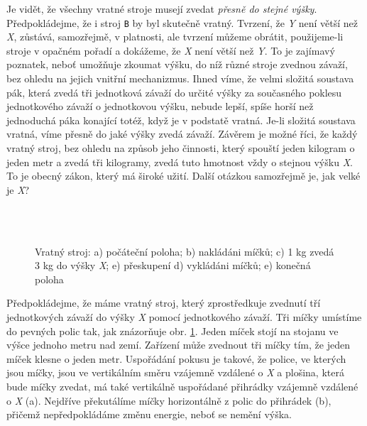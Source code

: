     Je vidět, že všechny vratné stroje musejí zvedat \emph{přesně do stejné výšky}. Předpokládejme, 
    že i stroj \texttt{B} by byl skutečně vratný. Tvrzení, že \emph{Y} není větší než \emph{X}, 
    zůstává, samozřejmě, v platnosti, ale tvrzení můžeme obrátit, použijeme-li stroje v opačném 
    pořadí a dokážeme, že \emph{X} není větší než \emph{Y}. To je zajímavý poznatek, neboť umožňuje 
    zkoumat výšku, do níž různé stroje zvednou závaží, bez ohledu na jejich vnitřní mechanizmus. 
    Ihned víme, že velmi složitá soustava pák, která zvedá tři jednotková závaží do určité výšky za 
    současného poklesu jednotkového závaží o jednotkovou výšku, nebude lepší, spíše horší než 
    jednoduchá páka konající totéž, když je v podstatě vratná. Je-li složitá soustava vratná, víme 
    přesně do jaké výšky zvedá závaží. Závěrem je možné říci, že každý vratný stroj, bez ohledu na 
    způsob jeho činnosti, který spouští jeden kilogram o jeden metr a zvedá tři kilogramy, zvedá 
    tuto hmotnost vždy o stejnou výšku \emph{X}. To je obecný zákon, který má široké užití. Další 
    otázkou samozřejmě je, jak velké je \emph{X}?

    \begin{figure}[ht!]  %
      \centering
      \hspace{1em}                                                       
      \hspace{1em}                                                       
      \\     
      \\                  
      \hspace{1em}                                                       
      \caption{Vratný stroj: a) počáteční poloha; b) nakládáni míčků; c) 1 kg zvedá 3 kg do výšky 
              \emph{X}; e) přeskupení  d) vykládáni míčků; e) konečná poloha 
              \cite[s.~53]{Feynman01}}
      \label{fyz:fig0049}
    \end{figure}
    
    Předpokládejme, že máme vratný stroj, který zprostředkuje zvednutí tří jednotkových závaží do 
    výšky \emph{X} pomocí jednotkového závaží. Tři míčky umístíme do pevných polic tak, jak 
    znázorňuje obr. \ref{fyz:fig0049}. Jeden míček stojí na stojanu ve výšce jednoho metru nad zemí. 
    Zařízení může zvednout tři míčky tím, že jeden míček klesne o jeden metr. Uspořádání pokusu je 
    takové, že police, ve kterých jsou míčky, jsou ve vertikálním směru vzájemně vzdálené o 
    \emph{X} a plošina, která bude míčky zvedat, má také vertikálně uspořádané přihrádky vzájemně 
    vzdálené o \emph{X} (a). Nejdříve překutálíme míčky horizontálně z polic do přihrádek (b), 
    přičemž nepředpokládáme změnu energie, neboť se nemění výška.


